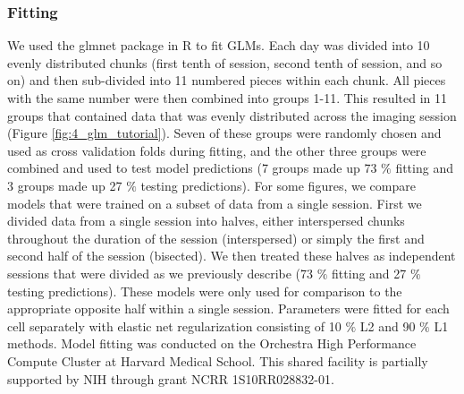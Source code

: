 \subsubsection{Fitting}\label{methods:fitting}
We used the glmnet package in R to fit GLMs. Each day was divided into 10 evenly distributed chunks (first tenth of session, second tenth of session, and so on) and then sub-divided into 11 numbered pieces within each chunk. All pieces with the same number were then combined into groups 1-11. This resulted in 11 groups that contained data that was evenly distributed across the imaging session (Figure \ref{fig:4_glm_tutorial}). Seven of these groups were randomly chosen and used as cross validation folds during fitting, and the other three groups were combined and used to test model predictions (7 groups made up 73 $\%$  fitting and 3 groups made up 27 $\%$  testing predictions). For some figures, we compare models that were trained on a subset of data from a single session. First we divided data from a single session into halves, either interspersed chunks throughout the duration of the session (interspersed) or simply the first and second half of the session (bisected). We then treated these halves as independent sessions that were divided as we previously describe (73 $\%$  fitting and 27 $\%$  testing predictions). These models were only used for comparison to the appropriate opposite half within a single session. Parameters were fitted for each cell separately with elastic net regularization consisting of 10 $\%$  L2 and 90 $\%$  L1 methods. Model fitting was conducted on the Orchestra High Performance Compute Cluster at Harvard Medical School. This shared facility is partially supported by NIH through grant NCRR 1S10RR028832-01.
 
